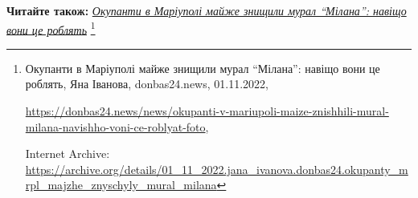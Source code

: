  
 
 
 
 


\textbf{Читайте також:} \href{https://archive.org/details/01_11_2022.jana_ivanova.donbas24.okupanty_mrpl_majzhe_znyschyly_mural_milana}{\emph{Окупанти в Маріуполі майже знищили мурал \enquote{Мілана}: навіщо вони це роблять}}%
\footnote{Окупанти в Маріуполі майже знищили мурал \enquote{Мілана}: навіщо вони це роблять, Яна Іванова, donbas24.news, 01.11.2022, \par%
\url{https://donbas24.news/news/okupanti-v-mariupoli-maize-znishhili-mural-milana-navishho-voni-ce-roblyat-foto}, \par%
Internet Archive: \url{https://archive.org/details/01_11_2022.jana_ivanova.donbas24.okupanty_mrpl_majzhe_znyschyly_mural_milana}%
}
